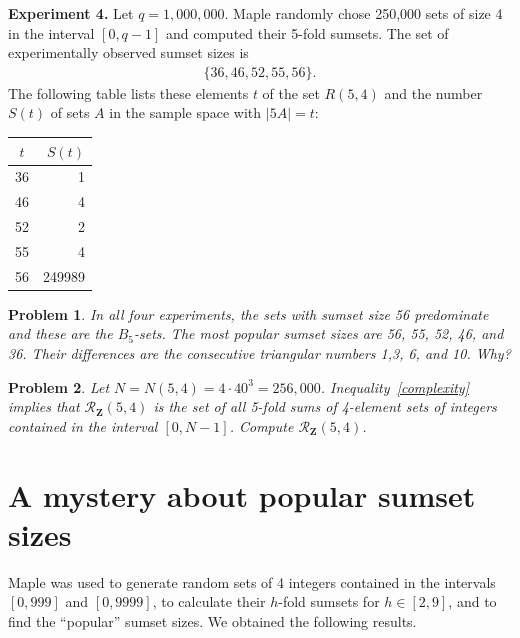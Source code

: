 \documentclass{amsart}
\newtheorem{problem}{Problem}
\newcommand{\bprob}{\begin{problem}}
\newcommand{\eprob}{\end{problem}}
\newcommand{\Z}{\ensuremath{\mathbf Z}}
\newcommand{\mcr}{\ensuremath{ \mathcal R}}
\begin{document}
\textbf{Experiment 4.}
Let $q = 1,000,000$. 
Maple randomly chose 250,000 sets of size 4 
in the interval  $[0,q-1]$  and computed their 5-fold sumsets.  
 The set of  experimentally observed sumset sizes is  
\begin{align*}
\{ 36,  46,  52,   55, 56\}. 
\end{align*}
The following table lists these elements $t$ of the set $R(5,4)$ and the number $S(t)$ of sets $A$  in the sample space with $|5A|= t$: \\

\begin{center}
\begin{tabular}{cr }
$t$ & $S(t)$    \\ \hline
36 & 1 \\
 46& 4 \\
52 & 2\\
 55 &4 \\
 56 & 249989  
\end{tabular}
\end{center}

\bprob
In all four experiments, the sets with sumset size 56 predominate 
and these are the $B_5$-sets.  
The most popular sumset sizes are 56, 55, 52, 46, and 36. 
Their differences are the consecutive triangular numbers 1,3, 6, and 10.  
Why? 
\eprob


\bprob
Let $N = N(5,4) = 4\cdot 40^3 = 256,000$. Inequality~\eqref{complexity} 
implies that $\mcr_{\Z}(5,4)$ is the set of all 
5-fold sums of  4-element sets of integers contained 
in the interval $[0,N-1]$. 
Compute $\mcr_{\Z}(5,4)$. 

\eprob




\section{A mystery about popular sumset sizes}
Maple was used to generate random sets of 4 integers contained in the intervals $[0,999]$ and $[0,9999]$, to calculate 
their $h$-fold sumsets for $h \in [2,9]$, and to find the ``popular'' sumset sizes.  We obtained the following results.    \\
\end{document}
